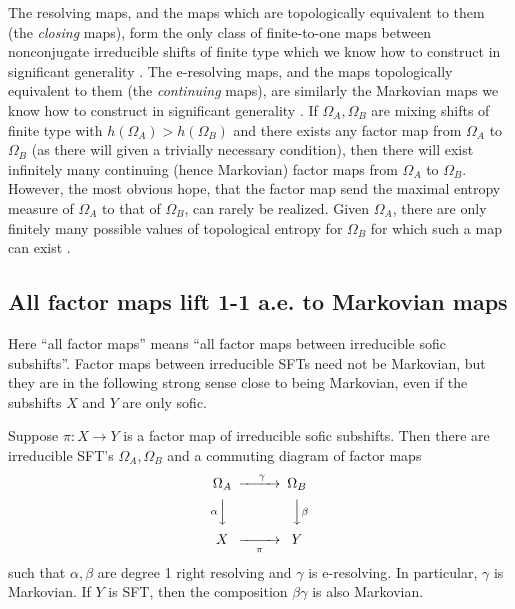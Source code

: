 \documentclass{kepart2010}
\theoremstyle{plain}
\theoremstyle{definition}
\theoremstyle{remark}
\theoremstyle{definition}
\numberwithin{equation}{section}
\begin{document}
The resolving maps, and the maps which are topologically equivalent
to them (the {\em closing} maps), form the  only class of
finite-to-one maps between nonconjugate irreducible shifts of finite
type which we know how to construct in significant generality
\cite{Ashley1991, Ashley1993,LindMarcus1995,Kitchens1998,Boyle2005}.
The e-resolving maps, and the maps topologically equivalent to them
(the {\em continuing} maps), are similarly the Markovian maps we
know how to construct in significant generality
\cite{BoyleTuncel1984}.
{ If $\Omega_A, \Omega_B$ are mixing shifts
of finite type with $h(\Omega_A)>h(\Omega_B)$ and there exists any
factor map from $\Omega_A$ to $\Omega_B$ (as there will given a
trivially necessary condition), then there will exist infinitely
many continuing (hence Markovian) factor maps from $\Omega_A$ to
$\Omega_B$. However, the most obvious hope, that the factor map send
the maximal entropy measure of $\Omega_A$ to that of $\Omega_B$, can
rarely be realized. Given $\Omega_A$, there are only finitely many
possible values of topological entropy for $\Omega_B$ for which such
a map can exist \cite{BoyleTuncel1984}. }

\subsection{All factor maps lift 1-1 a.e. to Markovian
maps}\label{sec_1-1aemarkovian}

Here ``all factor maps'' means ``all factor maps between irreducible
sofic {subshifts}''. Factor maps between irreducible SFTs need not
be Markovian, but  they are in the following strong sense close to
being Markovian, even if the subshifts $X$ and $Y$ are only sofic.

\begin{thm}\cite{Boyle2005}\label{th_soficlifttomarkovian}
Suppose $\pi : X\to Y$ is a factor map of irreducible sofic
subshifts.
 Then there are irreducible SFT's
$\Omega_A , \Omega_B$ and
a commuting diagram of factor maps
 \begin{equation}
\label{soficdiagram}
 \begin{CD}
\Omega_A & @>\ \gamma  >> & \Omega_B \\
 @V \alpha VV & & @VV \beta  V\\
 X & @>>\ \pi \ > & Y
 \end{CD}
 \end{equation}
such that $\alpha, \beta$ are degree 1 right resolving and $\gamma$
is e-resolving. In particular, $\gamma$ is Markovian. If $Y$ is
SFT, then the composition $\beta \gamma$ is also Markovian.
\end{thm}
\end{document}
